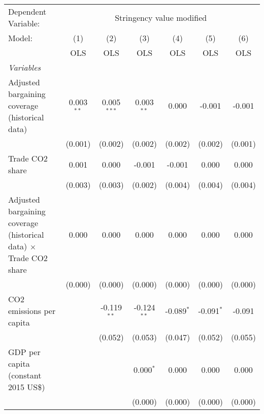 
\begingroup
\centering
\begin{tabular}{lcccccc}
   \toprule
   Dependent Variable: & \multicolumn{6}{c}{Stringency value modified}\\
   Model:                                                                   & (1)          & (2)           & (3)           & (4)          & (5)          & (6)\\  
                                                                            &  OLS         & OLS           & OLS           & OLS          & OLS          & OLS\\  
   \midrule
   \emph{Variables}\\
   Adjusted bargaining coverage (historical data)                           & 0.003$^{**}$ & 0.005$^{***}$ & 0.003$^{**}$  & 0.000        & -0.001       & -0.001\\   
                                                                            & (0.001)      & (0.002)       & (0.002)       & (0.002)      & (0.002)      & (0.001)\\   
   Trade CO2 share                                                          & 0.001        & 0.000         & -0.001        & -0.001       & 0.000        & 0.000\\   
                                                                            & (0.003)      & (0.003)       & (0.002)       & (0.004)      & (0.004)      & (0.004)\\   
   Adjusted bargaining coverage (historical data) $\times$ Trade CO2 share  & 0.000        & 0.000         & 0.000         & 0.000        & 0.000        & 0.000\\   
                                                                            & (0.000)      & (0.000)       & (0.000)       & (0.000)      & (0.000)      & (0.000)\\   
   CO2 emissions per capita                                                 &              & -0.119$^{**}$ & -0.124$^{**}$ & -0.089$^{*}$ & -0.091$^{*}$ & -0.091\\   
                                                                            &              & (0.052)       & (0.053)       & (0.047)      & (0.052)      & (0.055)\\   
   GDP per capita (constant 2015 US\$)                                      &              &               & 0.000$^{*}$   & 0.000        & 0.000        & 0.000\\   
                                                                            &              &               & (0.000)       & (0.000)      & (0.000)      & (0.000)\\   

\end{tabular}
